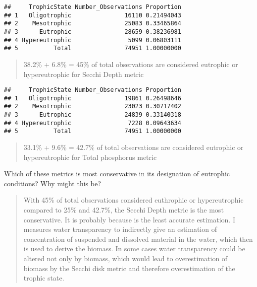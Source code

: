 \documentclass[]{article}
\newenvironment{Shaded}{\begin{snugshade}}{\end{snugshade}}
\newcommand{\CommentTok}[1]{\textcolor[rgb]{0.56,0.35,0.01}{\textit{#1}}}
\newcommand{\DataTypeTok}[1]{\textcolor[rgb]{0.13,0.29,0.53}{#1}}
\newcommand{\DecValTok}[1]{\textcolor[rgb]{0.00,0.00,0.81}{#1}}
\newcommand{\KeywordTok}[1]{\textcolor[rgb]{0.13,0.29,0.53}{\textbf{#1}}}
\newcommand{\NormalTok}[1]{#1}
\newcommand{\OperatorTok}[1]{\textcolor[rgb]{0.81,0.36,0.00}{\textbf{#1}}}
\newcommand{\StringTok}[1]{\textcolor[rgb]{0.31,0.60,0.02}{#1}}
\begin{document}
\begin{verbatim}
##     TrophicState Number_Observations Proportion
## 1   Oligotrophic               16110 0.21494043
## 2    Mesotrophic               25083 0.33465864
## 3      Eutrophic               28659 0.38236981
## 4 Hypereutrophic                5099 0.06803111
## 5          Total               74951 1.00000000
\end{verbatim}

\begin{quote}
38.2\% + 6.8\% = 45\% of total observations are considered eutrophic or
hypereutrophic for Secchi Depth metric
\end{quote}

\begin{Shaded}
\end{Shaded}

\begin{verbatim}
##     TrophicState Number_Observations Proportion
## 1   Oligotrophic               19861 0.26498646
## 2    Mesotrophic               23023 0.30717402
## 3      Eutrophic               24839 0.33140318
## 4 Hypereutrophic                7228 0.09643634
## 5          Total               74951 1.00000000
\end{verbatim}

\begin{quote}
33.1\% + 9.6\% = 42.7\% of total observations are considered eutrophic
or hypereutrophic for Total phosphorus metric
\end{quote}

Which of these metrics is most conservative in its designation of
eutrophic conditions? Why might this be?

\begin{quote}
With 45\% of total observations considered euthrophic or hypereutrophic
compared to 25\% and 42.7\%, the Secchi Depth metric is the most
conservative. It is probably because is the least accurate estimation. I
measures water transparency to indirectly give an estimation of
concentration of suspended and dissolved material in the water, which
then is used to derive the biomass. In some cases water transparency
could be altered not only by biomass, which would lead to overestimation
of biomass by the Secchi disk metric and therefore overestimation of the
trophic state.
\end{quote}
\end{document}
